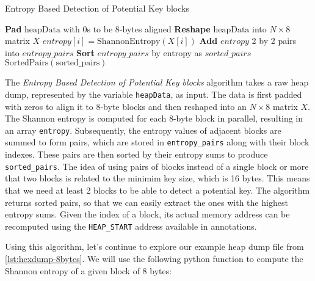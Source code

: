     \begin{algorithm}
        \caption{Entropy Based Detection of Potential Key blocks}
        \begin{algorithmic}[1]
            \State \textbf{Pad} $\text{heapData}$ with 0s to be 8-bytes aligned
            \State \textbf{Reshape} $\text{heapData}$ into $N \times 8$ matrix $X$
                \State $entropy[i] = \text{ShannonEntropy}(X[i])$ 
            \EndFor
            \State \textbf{Add} $entropy$ 2 by 2 pairs into $entropy\_pairs$ 
            \State \textbf{Sort} $entropy\_pairs$ by entropy as $sorted\_pairs$
            \State \Return $\text{SortedPairs}(\text{sorted\_pairs})$
        \EndProcedure
        \end{algorithmic}
    \end{algorithm}

    The \textit{Entropy Based Detection of Potential Key blocks} algorithm takes a raw heap dump, represented by the variable \texttt{heapData}, as input. The data is first padded with zeros to align it to 8-byte blocks and then reshaped into an $N \times 8$ matrix $X$. The Shannon entropy is computed for each 8-byte block in parallel, resulting in an array \texttt{entropy}. Subsequently, the entropy values of adjacent blocks are summed to form pairs, which are stored in \texttt{entropy\_pairs} along with their block indexes. These pairs are then sorted by their entropy sums to produce \texttt{sorted\_pairs}. The idea of using pairs of blocks instead of a single block or more that two blocks is related to the minimim key size, which is 16 bytes. This means that we need at least 2 blocks to be able to detect a potential key. The algorithm returns sorted pairs, so that we can easily extract the ones with the highest entropy sums. Given the index of a block, its actual memory address can be recomputed using the \texttt{HEAP\_START} address available in annotations.
    
    Using this algorithm, let's continue to explore our example heap dump file from \ref{lst:hexdump-8bytes}. We will use the following python function to compute the Shannon entropy of a given block of 8 bytes:

